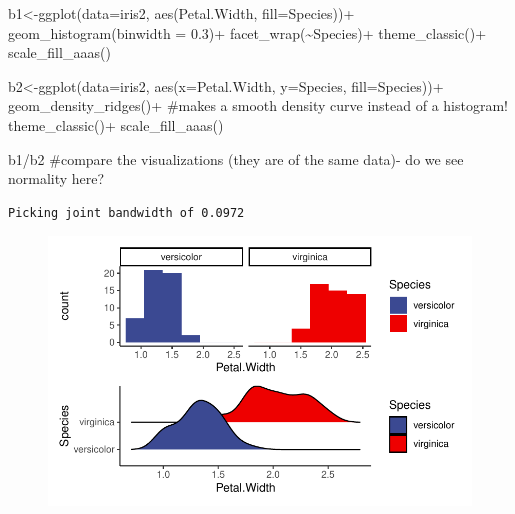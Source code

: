 \documentclass[
  letterpaper,
  DIV=11,
  numbers=noendperiod]{scrartcl}
\newenvironment{Shaded}{\begin{snugshade}}{\end{snugshade}}
\newcommand{\AttributeTok}[1]{\textcolor[rgb]{0.40,0.45,0.13}{#1}}
\newcommand{\CommentTok}[1]{\textcolor[rgb]{0.37,0.37,0.37}{#1}}
\newcommand{\FloatTok}[1]{\textcolor[rgb]{0.68,0.00,0.00}{#1}}
\newcommand{\FunctionTok}[1]{\textcolor[rgb]{0.28,0.35,0.67}{#1}}
\newcommand{\NormalTok}[1]{\textcolor[rgb]{0.00,0.23,0.31}{#1}}
\newcommand{\OtherTok}[1]{\textcolor[rgb]{0.00,0.23,0.31}{#1}}
\newcommand{\SpecialCharTok}[1]{\textcolor[rgb]{0.37,0.37,0.37}{#1}}
\begin{document}
\begin{Shaded}
\begin{Highlighting}[]
\NormalTok{b1}\OtherTok{\textless{}{-}}\FunctionTok{ggplot}\NormalTok{(}\AttributeTok{data=}\NormalTok{iris2, }\FunctionTok{aes}\NormalTok{(Petal.Width, }\AttributeTok{fill=}\NormalTok{Species))}\SpecialCharTok{+}
  \FunctionTok{geom\_histogram}\NormalTok{(}\AttributeTok{binwidth =} \FloatTok{0.3}\NormalTok{)}\SpecialCharTok{+} 
  \FunctionTok{facet\_wrap}\NormalTok{(}\SpecialCharTok{\textasciitilde{}}\NormalTok{Species)}\SpecialCharTok{+}
  \FunctionTok{theme\_classic}\NormalTok{()}\SpecialCharTok{+}
  \FunctionTok{scale\_fill\_aaas}\NormalTok{()}

\NormalTok{b2}\OtherTok{\textless{}{-}}\FunctionTok{ggplot}\NormalTok{(}\AttributeTok{data=}\NormalTok{iris2, }\FunctionTok{aes}\NormalTok{(}\AttributeTok{x=}\NormalTok{Petal.Width, }\AttributeTok{y=}\NormalTok{Species, }\AttributeTok{fill=}\NormalTok{Species))}\SpecialCharTok{+}
  \FunctionTok{geom\_density\_ridges}\NormalTok{()}\SpecialCharTok{+} \CommentTok{\#makes a smooth density curve instead of a histogram!}
  \FunctionTok{theme\_classic}\NormalTok{()}\SpecialCharTok{+}
  \FunctionTok{scale\_fill\_aaas}\NormalTok{()}

\NormalTok{b1}\SpecialCharTok{/}\NormalTok{b2 }\CommentTok{\#compare the visualizations (they are of the same data){-} do we see normality here?}
\end{Highlighting}
\end{Shaded}

\begin{verbatim}
Picking joint bandwidth of 0.0972
\end{verbatim}

\begin{figure}[H]

{\centering \includegraphics{cor_reg_chi_files/figure-pdf/unnamed-chunk-24-1.pdf}

}

\end{figure}
\end{document}
